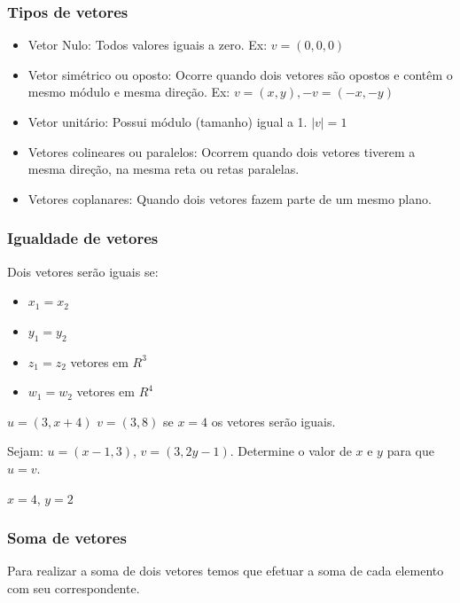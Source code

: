 \documentclass[12pt]{article}
\begin{document}
\subsubsection{Tipos de vetores}

\singlespacing
\begin{itemize}
	\item Vetor Nulo: Todos valores iguais a zero. Ex: \(v = (0,0,0)\)
	\item Vetor simétrico ou oposto: Ocorre quando dois vetores são opostos e contêm o mesmo módulo e mesma direção. Ex: \(v = (x,y), -v = (-x,-y)\)
	\item Vetor unitário: Possui módulo (tamanho) igual a 1. \(|v| = 1\)
	\item Vetores colineares ou paralelos: Ocorrem quando dois vetores tiverem a mesma direção, na mesma reta ou retas paralelas.
	\item Vetores coplanares: Quando dois vetores fazem parte de um mesmo plano.
\end{itemize}
\onehalfspacing
\pagebreak

\subsubsection{Igualdade de vetores}

Dois vetores serão iguais se: 

\singlespacing
\begin{itemize}
	\item \(x_{1} = x_{2}\)
	\item \(y_{1} = y_{2}\)
	\item \(z_{1} = z_{2}\) vetores em \(R^{3}\)
	\item \(w_{1} = w_{2}\) vetores em \(R^{4}\)
\end{itemize}
\onehalfspacing

\(u = (3, x + 4)\) \(v = (3, 8)\) se \(x = 4\) os vetores serão iguais.

Sejam: \(u = (x-1, 3)\), \(v = (3, 2y-1)\). Determine o valor de \(x\) e \(y\) para que \(u = v\).

\(x = 4\), \(y = 2\)

\subsubsection{Soma de vetores}

Para realizar a soma de dois vetores temos que efetuar a soma de cada elemento com seu correspondente.
\end{document}
